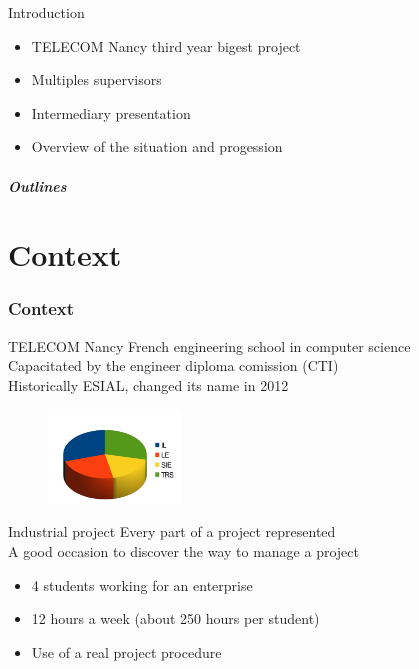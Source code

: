 \documentclass[12pt]{beamer}
\title{\titreA}
\subtitle{\titreB}
\author{Nicolas BOUGET, Julien GUEPIN, Marc PINHEDE, Julien VAUBOURG}
\institute{TELECOM Nancy}
\date{December 20, 2012}
\begin{document}
\begin{frame}
\titlepage
\end{frame}

\begin{frame}{Introduction}
    \begin{itemize}
	\item TELECOM Nancy third year bigest project
	\vfill
	\item Multiples supervisors
	\vfill
	\item Intermediary presentation
	\vfill
	\item Overview of the situation and progession
    \end{itemize}
\end{frame}

\begin{frame}
    \frametitle{Outlines}
	\tableofcontents[pausesection]
\end{frame}



    
\part{Context}
\frame{\partpage}
\section{Context}

\begin{frame}{TELECOM Nancy}
    French engineering school in computer science\\
    \vfill
    Capacitated by the engineer diploma comission (CTI)\\
    \vfill
    Historically ESIAL, changed its name in 2012\\
    \vfill
    \begin{figure}
	\includegraphics[width=100pt]{img/promo.jpg}
    \end{figure}
\end{frame}



\begin{frame}{Industrial project}
    Every part of a project represented\\
    \vfill
    A good occasion to discover the way to manage a project
    \vfill
    \begin{itemize}
	\item 4 students working for an enterprise
	\item 12 hours a week (about 250 hours per student)
	\item Use of a real project procedure
    \end{itemize}
\end{frame}
\end{document}
